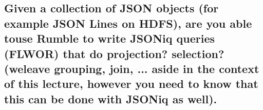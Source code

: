 \documentclass{article}
\begin{document}
\subsection{Given a collection of JSON objects (for example JSON Lines on HDFS), are you able touse Rumble to write JSONiq queries (FLWOR) that do projection? selection? (weleave grouping, join, ... aside in the context of this lecture, however you need to know that this can be done with JSONiq as well).}

\end{document}
